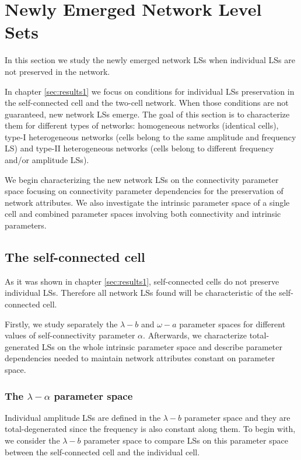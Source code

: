 \chapter{Newly Emerged Network Level Sets}
\label{sec:results2}
In this section we study the newly emerged network LSs when individual LSs are not preserved in the network.

In chapter \ref{sec:results1} we focus on conditions for individual LSs preservation in the self-connected cell and the two-cell network. When those conditions are not guaranteed, new network LSs emerge. The goal of this section is to characterize them for different types of networks: homogeneous networks (identical cells), type-\textrm{I} heterogeneous networks (cells belong to the same amplitude and frequency  LS) and type-\textrm{II} heterogeneous networks (cells belong to different frequency and/or amplitude LSs).

We begin characterizing the new network LSs on the connectivity parameter space focusing on connectivity parameter dependencies for the preservation of network attributes. We also investigate the intrinsic parameter space of a single cell and combined parameter spaces involving both connectivity and intrinsic parameters.

\section{The self-connected cell}
As it was shown in chapter \ref{sec:results1}, self-connected cells do not preserve individual LSs. Therefore all network LSs found will be characteristic of the self-connected cell.

Firstly, we study separately the $\lambda-b$ and $\omega-a$ parameter spaces for different values of self-connectivity parameter $\alpha$. Afterwards, we characterize total-generated LSs on the whole intrinsic parameter space and describe parameter dependencies needed to maintain network attributes constant on parameter space.

\subsection{The $\lambda-\alpha$ parameter space}
Individual amplitude LSs are defined in the $\lambda-b$ parameter space and they are total-degenerated since the frequency is also constant along them. To begin with, we consider the $\lambda-b$ parameter space to compare LSs on this parameter space between the self-connected cell and the individual cell.

